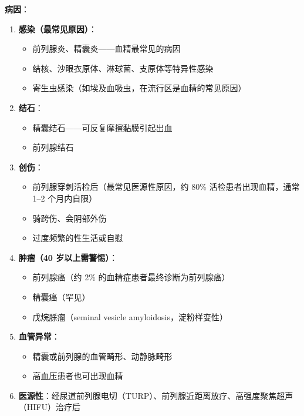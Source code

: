 \documentclass[12pt,a4paper,twoside]{ctexbook}
\begin{document}
\vspace{0.5em}
\noindent\textbf{病因}：

\begin{enumerate}
	\item \textbf{感染（最常见原因）}：
	\begin{itemize}
		\item 前列腺炎、精囊炎——血精最常见的病因
		\item 结核、沙眼衣原体、淋球菌、支原体等特异性感染
		\item 寄生虫感染（如埃及血吸虫，在流行区是血精的常见原因）
	\end{itemize}

	\item \textbf{结石}：
	\begin{itemize}
		\item 精囊结石——可反复摩擦黏膜引起出血
		\item 前列腺结石
	\end{itemize}

	\item \textbf{创伤}：
	\begin{itemize}
		\item 前列腺穿刺活检后（最常见医源性原因，约 80\% 活检患者出现血精，通常 1--2 个月内自限）
		\item 骑跨伤、会阴部外伤
		\item 过度频繁的性生活或自慰
	\end{itemize}

	\item \textbf{肿瘤（40 岁以上需警惕）}：
	\begin{itemize}
		\item 前列腺癌（约 2\% 的血精症患者最终诊断为前列腺癌）
		\item 精囊癌（罕见）
		\item 戊烷脎瘤（seminal vesicle amyloidosis，淀粉样变性）
	\end{itemize}

	\item \textbf{血管异常}：
	\begin{itemize}
		\item 精囊或前列腺的血管畸形、动静脉畸形
		\item 高血压患者也可出现血精
	\end{itemize}

	\item \textbf{医源性}：经尿道前列腺电切（TURP）、前列腺近距离放疗、高强度聚焦超声（HIFU）治疗后
\end{enumerate}
\end{document}
